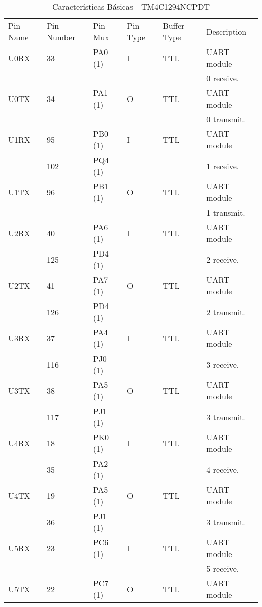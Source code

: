 \begin{table}[H]
\centering
\caption{Características Básicas - TM4C1294NCPDT \cite{DATASHEET_TIVA}}
\label{TabelaPinosUart}
\begin{tabular}{|l|l|l|l|l|l|}
\hline
\cellcolor[HTML]{343434} \color[HTML]{FFFFFF} Pin Name & \cellcolor[HTML]{343434} \color[HTML]{FFFFFF} Pin Number & \cellcolor[HTML]{343434} \color[HTML]{FFFFFF} Pin Mux & \cellcolor[HTML]{343434} \color[HTML]{FFFFFF} Pin Type & \cellcolor[HTML]{343434} \color[HTML]{FFFFFF} Buffer Type & \cellcolor[HTML]{343434} \color[HTML]{FFFFFF} Description \\
U0RX & 33 & PA0 (1) & I & TTL & UART module \\
 & & & & & 0 receive.\\
\hline
U0TX & 34 & PA1 (1) & O & TTL & UART module  \\
 & & & & & 0 transmit.\\
\hline
U1RX & 95  & PB0 (1)  & I  & TTL & UART module  \\
     & 102 & PQ4 (1)  &    &   &  1 receive.      \\
\hline
U1TX & 96  & PB1 (1) & O & TTL & UART module \\
 & & & & & 1 transmit.\\
\hline
U2RX & 40 & PA6 (1) & I & TTL & UART module\\
     & 125   & PD4 (1)        &   &     &    2 receive.  \\
\hline
U2TX & 41 & PA7 (1) & O & TTL & UART module \\
     & 126   & PD4 (1)        &   &     &   2 transmit. \\
\hline
U3RX & 37 & PA4 (1) & I & TTL & UART module \\
     &  116 & PJ0 (1) & & & 3 receive. \\
\hline
U3TX & 38 & PA5 (1) & O & TTL & UART module\\
     &  117 & PJ1 (1) & & & 3 transmit.\\
\hline
U4RX & 18 & PK0 (1) & I & TTL & UART module \\
     & 35 & PA2 (1) &  & & 4 receive. \\
\hline
U4TX & 19 & PA5 (1) & O & TTL & UART module \\
     &  36 & PJ1 (1) & & & 3 transmit. \\
\hline
U5RX & 23 & PC6 (1) & I & TTL & UART module  \\
 & & & & & 5 receive. \\
\hline
U5TX & 22 & PC7 (1) & O & TTL & UART module\\

\end{tabular}
\end{table}
